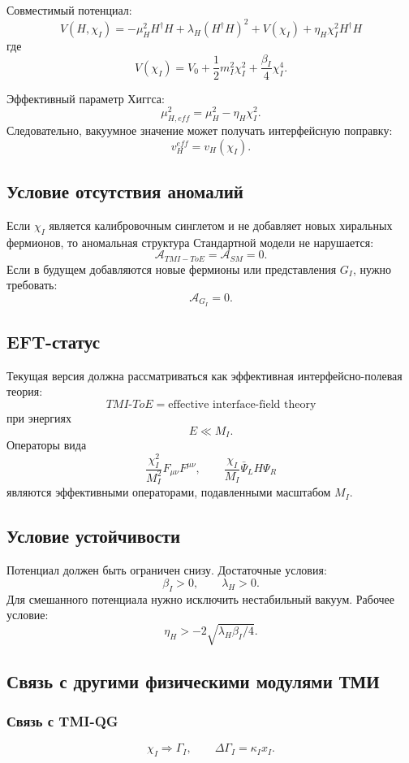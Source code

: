 \documentclass[12pt,a4paper]{article}
\begin{document}
Совместимый потенциал:
\[
\boxed{
V(H,\chi_I)=
-\mu_H^2H^\dagger H+
\lambda_H(H^\dagger H)^2+
V(\chi_I)+
\eta_H\chi_I^2H^\dagger H
}
\]
где
\[
\boxed{V(\chi_I)=V_0+\frac12m_I^2\chi_I^2+\frac{\beta_I}{4}\chi_I^4}.
\]

Эффективный параметр Хиггса:
\[
\boxed{\mu_{H,eff}^2=\mu_H^2-\eta_H\chi_I^2}.
\]
Следовательно, вакуумное значение может получать интерфейсную поправку:
\[
\boxed{v_H^{eff}=v_H(\chi_I)}.
\]

\subsection{Условие отсутствия аномалий}

Если $\chi_I$ является калибровочным синглетом и не добавляет новых хиральных фермионов, то аномальная структура Стандартной модели не нарушается:
\[
\boxed{\mathcal A_{TMI-ToE}=\mathcal A_{SM}=0}.
\]
Если в будущем добавляются новые фермионы или представления $G_I$, нужно требовать:
\[
\boxed{\mathcal A_{G_I}=0}.
\]

\subsection{EFT-статус}

Текущая версия должна рассматриваться как эффективная интерфейсно-полевая теория:
\[
\boxed{TMI\mbox{-}ToE=\text{effective interface-field theory}}
\]
при энергиях
\[
\boxed{E\ll M_I}.
\]
Операторы вида
\[
\frac{\chi_I^2}{M_I^2}F_{\mu\nu}F^{\mu\nu},\qquad
\frac{\chi_I}{M_I}\bar\Psi_LH\Psi_R
\]
являются эффективными операторами, подавленными масштабом $M_I$.

\subsection{Условие устойчивости}

Потенциал должен быть ограничен снизу. Достаточные условия:
\[
\boxed{\beta_I>0,\qquad \lambda_H>0}.
\]
Для смешанного потенциала нужно исключить нестабильный вакуум. Рабочее условие:
\[
\boxed{\eta_H>-2\sqrt{\lambda_H\beta_I/4}}.
\]

\subsection{Связь с другими физическими модулями ТМИ}

\subsubsection*{Связь с TMI-QG}
\[
\boxed{\chi_I\Rightarrow\Gamma_I},\qquad
\boxed{\Delta\Gamma_I=\kappa_Ix_I}.
\]
\end{document}
